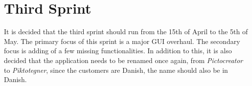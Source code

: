 \chapter{Third Sprint}
It is decided that the third sprint should run from the 15th of April to the 5th of May.
The primary focus of this sprint is a major GUI overhaul.
The secondary focus is adding of a few missing functionalities.
In addition to this, it is also decided that the application needs to be renamed once again, from \textit{Pictocreator} to \textit{Piktotegner}, since the customers are Danish, the name should also be in Danish.





